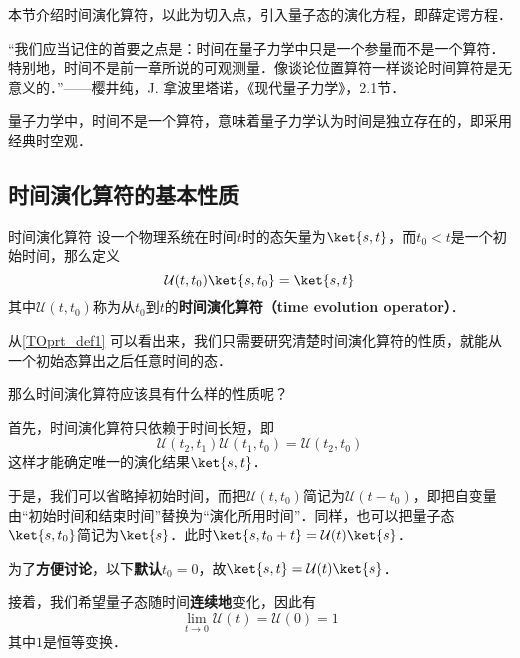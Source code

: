 


本节介绍时间演化算符，以此为切入点，引入量子态的演化方程，即薛定谔方程．


“我们应当记住的首要之点是：时间在量子力学中只是一个参量而不是一个算符．特别地，时间不是前一章所说的可观测量．像谈论位置算符一样谈论时间算符是无意义的．”——樱井纯，J. 拿波里塔诺，《现代量子力学》，2.1节．

量子力学中，时间不是一个算符，意味着量子力学认为时间是独立存在的，即采用经典时空观．


\subsection{时间演化算符的基本性质}

\begin{definition}{时间演化算符}\label{TOprt_def1}
设一个物理系统在时间$t$时的态矢量为$\ket{s, t}$，而$t_0<t$是一个初始时间，那么定义
\begin{equation}\label{TOprt_eq1}
\mathcal{U}(t, t_0)\ket{s, t_0}=\ket{s, t}
\end{equation}
其中$\mathcal{U}(t, t_0)$称为从$t_0$到$t$的\textbf{时间演化算符（time evolution operator）}．
\end{definition}

从\autoref{TOprt_def1} 可以看出来，我们只需要研究清楚时间演化算符的性质，就能从一个初始态算出之后任意时间的态．

那么时间演化算符应该具有什么样的性质呢？


首先，时间演化算符只依赖于时间长短，即
\begin{equation}\label{TOprt_eq2}
\mathcal{U}(t_2, t_1)\mathcal{U}(t_1, t_0) = \mathcal{U}(t_2, t_0)
\end{equation}
这样才能确定唯一的演化结果$\ket{s, t}$．

于是，我们可以省略掉初始时间，而把$\mathcal{U}(t, t_0)$简记为$\mathcal{U}(t-t_0)$，即把自变量由“初始时间和结束时间”替换为“演化所用时间”．同样，也可以把量子态$\ket{s, t_0}$简记为$\ket{s}$．此时$\ket{s, t_0+t}=\mathcal{U}(t)\ket{s}$．

为了\textbf{方便讨论}，以下\textbf{默认}$t_0=0$，故$\ket{s, t}=\mathcal{U}(t)\ket{s}$．

接着，我们希望量子态随时间\textbf{连续地}变化，因此有
\begin{equation}\label{TOprt_eq3}
\lim_{t\to 0}\mathcal{U}(t) = \mathcal{U}(0) = 1
\end{equation}
其中$1$是恒等变换．

